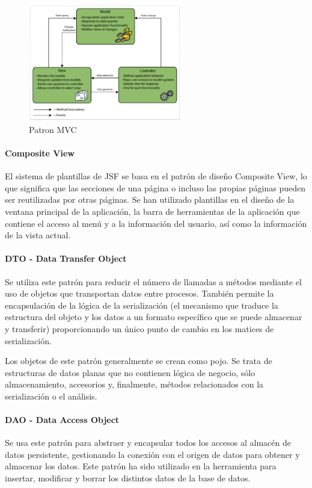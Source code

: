 \begin{figure}[H]
  \centering
  \includegraphics[width=0.6\textwidth]{imaxes/mvc-patron.png}
  \caption{Patron MVC}
  \label{fig:patron-mvc}
\end{figure}




    
\paragraph{Composite View}
El sistema de plantillas de JSF se basa en el patrón de diseño Composite View,
lo que significa que las secciones de una página o incluso las propias páginas pueden ser reutilizadas por otras páginas.
Se han utilizado plantillas en el diseño de la ventana principal de la aplicación, la barra de herramientas de la aplicación que contiene el acceso al menú y a la información del usuario, así como la información de la vista actual.


\paragraph{DTO - Data Transfer Object}
Se utiliza este patrón para reducir el número de llamadas a métodos mediante el uso de objetos que transportan datos entre procesos. También permite la encapsulación de la lógica de la serialización (el mecanismo que traduce la estructura del objeto y los datos a un formato específico que se puede almacenar y transferir) proporcionando un único punto de cambio en los matices de serialización.

Los objetos de este patrón generalmente se crean como \acrlong{pojo}. Se trata de estructuras de datos planas que no contienen lógica de negocio, sólo  almacenamiento, accesorios y, finalmente, métodos relacionados con la serialización o el análisis.


\paragraph{DAO - Data Access Object}
Se usa este patrón para abstraer y encapsular todos los accesos al almacén de datos persistente, gestionando la conexión con el origen de datos para obtener y almacenar los datos. 
Este patrón ha sido utilizado en la herramienta para insertar, modificar y borrar los distintos datos de la base de datos.



